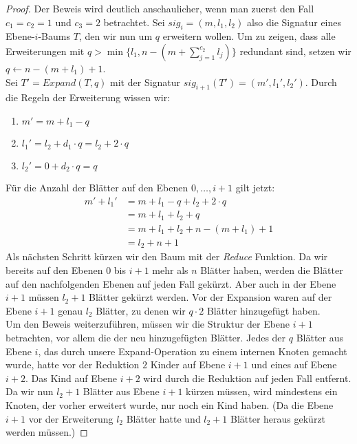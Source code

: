 \documentclass[a4paper,10pt,ngerman]{scrartcl}
\begin{document}
    \begin{proof}
        Der Beweis wird deutlich anschaulicher, wenn man zuerst den Fall $c_1 = c_2 = 1$ und $c_3 = 2$ betrachtet.
        Sei $sig_i = (m, l_1, l_2)$ also die Signatur eines Ebene-$i$-Baums $T$, den wir nun um $q$ erweitern wollen.
        Um zu zeigen, dass alle Erweiterungen mit $q > \min\{l_1, n - (m + \sum^{c_2}_{j=1} l_j)\}$ redundant sind, setzen wir $q \gets n - (m + l_1) + 1$. \\
        Sei $T' = Expand(T, q)$ mit der Signatur $sig_{i+1}(T') = (m', l_1', l_2')$.
        Durch die Regeln der Erweiterung wissen wir:
        \begin{enumerate}
            \item $m' = m + l_1 - q$
            \item $l_1' = l_2 + d_1 \cdot q = l_2 + 2 \cdot q$
            \item $l_2' = 0 + d_2 \cdot q = q$
        \end{enumerate}
        Für die Anzahl der Blätter auf den Ebenen $0, \dots, i + 1$ gilt jetzt:
        \begin{equation}
            \begin{aligned}
                m'+ l_1' &= m + l_1 - q + l_2 + 2 \cdot q\\
                &= m + l_1 + l_2 + q\\
                &= m + l_1 + l_2 + n - (m + l_1) + 1\\
                &= l_2 + n + 1
            \end{aligned}\label{eq:equation}
        \end{equation}
        Als nächsten Schritt kürzen wir den Baum mit der \textit{Reduce} Funktion.
        Da wir bereits auf den Ebenen $0$ bis $i+1$ mehr als $n$ Blätter haben, werden die Blätter auf den nachfolgenden Ebenen auf jeden Fall gekürzt.
        Aber auch in der Ebene $i + 1$ müssen $l_2 + 1$ Blätter gekürzt werden.
        Vor der Expansion waren auf der Ebene $i + 1$ genau $l_2$ Blätter, zu denen wir $q \cdot 2$ Blätter hinzugefügt haben. \\
        Um den Beweis weiterzuführen, müssen wir die Struktur der Ebene $i+1$ betrachten, vor allem die der neu hinzugefügten Blätter.
        Jedes der $q$ Blätter aus Ebene $i$, das durch unsere Expand-Operation zu einem internen Knoten gemacht wurde, hatte vor der Reduktion $2$ Kinder auf Ebene $i + 1$ und eines auf Ebene $i + 2$.
        Das Kind auf Ebene $i + 2$ wird durch die Reduktion auf jeden Fall entfernt.
        Da wir nun $l_2 + 1$ Blätter aus Ebene $i + 1$ kürzen müssen, wird mindestens ein Knoten, der vorher erweitert wurde, nur noch ein Kind haben. (Da die Ebene $i + 1$ vor der Erweiterung $l_2$ Blätter hatte und $l_2 + 1$ Blätter heraus gekürzt werden müssen.)

\end{proof}
\end{document}
